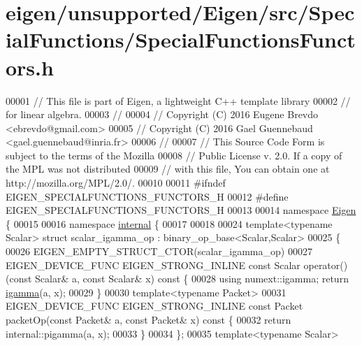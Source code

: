 \hypertarget{eigen_2unsupported_2_eigen_2src_2_special_functions_2_special_functions_functors_8h_source}{}\section{eigen/unsupported/\+Eigen/src/\+Special\+Functions/\+Special\+Functions\+Functors.h}
\label{eigen_2unsupported_2_eigen_2src_2_special_functions_2_special_functions_functors_8h_source}

\begin{DoxyCode}
00001 \textcolor{comment}{// This file is part of Eigen, a lightweight C++ template library}
00002 \textcolor{comment}{// for linear algebra.}
00003 \textcolor{comment}{//}
00004 \textcolor{comment}{// Copyright (C) 2016 Eugene Brevdo <ebrevdo@gmail.com>}
00005 \textcolor{comment}{// Copyright (C) 2016 Gael Guennebaud <gael.guennebaud@inria.fr>}
00006 \textcolor{comment}{//}
00007 \textcolor{comment}{// This Source Code Form is subject to the terms of the Mozilla}
00008 \textcolor{comment}{// Public License v. 2.0. If a copy of the MPL was not distributed}
00009 \textcolor{comment}{// with this file, You can obtain one at http://mozilla.org/MPL/2.0/.}
00010 
00011 \textcolor{preprocessor}{#ifndef EIGEN\_SPECIALFUNCTIONS\_FUNCTORS\_H}
00012 \textcolor{preprocessor}{#define EIGEN\_SPECIALFUNCTIONS\_FUNCTORS\_H}
00013 
00014 \textcolor{keyword}{namespace }\hyperlink{namespace_eigen}{Eigen} \{
00015 
00016 \textcolor{keyword}{namespace }\hyperlink{namespaceinternal}{internal} \{
00017 
00018 
00024 \textcolor{keyword}{template}<\textcolor{keyword}{typename} Scalar> \textcolor{keyword}{struct }scalar\_igamma\_op : binary\_op\_base<Scalar,Scalar>
00025 \{
00026   EIGEN\_EMPTY\_STRUCT\_CTOR(scalar\_igamma\_op)
00027   EIGEN\_DEVICE\_FUNC EIGEN\_STRONG\_INLINE \textcolor{keyword}{const} Scalar operator() (\textcolor{keyword}{const} Scalar& a, \textcolor{keyword}{const} Scalar& x)\textcolor{keyword}{ const }\{
00028     \textcolor{keyword}{using} numext::igamma; \textcolor{keywordflow}{return} \hyperlink{namespace_eigen_af5aa651137636b1cdbd27de1cfe91148}{igamma}(a, x);
00029   \}
00030   \textcolor{keyword}{template}<\textcolor{keyword}{typename} Packet>
00031   EIGEN\_DEVICE\_FUNC EIGEN\_STRONG\_INLINE \textcolor{keyword}{const} Packet packetOp(\textcolor{keyword}{const} Packet& a, \textcolor{keyword}{const} Packet& x)\textcolor{keyword}{ const }\{
00032     \textcolor{keywordflow}{return} internal::pigamma(a, x);
00033   \}
00034 \};
00035 \textcolor{keyword}{template}<\textcolor{keyword}{typename} Scalar>

\end{DoxyCode}
